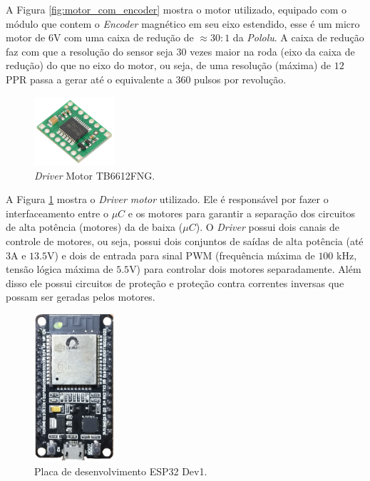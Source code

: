 A Figura \ref{fig:motor_com_encoder} mostra o motor utilizado, equipado com o módulo que contem o \textit{Encoder} magnético em seu eixo estendido, esse é um micro motor de $6$V com uma caixa de redução de $\approx 30:1$ da \textit{Pololu}\cite{Pololu}. A caixa de redução faz com que a resolução do sensor seja $30$ vezes maior na roda (eixo da caixa de redução) do que no eixo do motor, ou seja, de uma resolução (máxima) de $12$PPR passa a gerar até o equivalente a $360$ pulsos por revolução.\\

\begin{figure}[H]
    \centering
    \includegraphics[width=3cm]{figuras/eletronica/driver.jpg}
    \caption{\textit{Driver} Motor TB6612FNG.}
    \label{fig:driver_motor}
\end{figure}

A Figura \ref{fig:driver_motor} mostra o \emph{Driver motor} utilizado. Ele é responsável por fazer o interfaceamento entre o $\mu{}C$ e os motores para garantir a separação dos circuitos de alta potência (motores) da de baixa ($\mu{}C$). O \emph{Driver} possui dois canais de controle de motores, ou seja, possui dois conjuntos de saídas de alta potência (até $3$A e $13.5$V) e dois de entrada para sinal PWM (frequência máxima de $100$ kHz, tensão lógica máxima de $5.5$V) para controlar dois motores separadamente. Além disso ele possui circuitos de proteção e proteção contra correntes inversas que possam ser geradas pelos motores.\\


\begin{figure}[H]
    \centering
    \includegraphics[width=3cm]{figuras/eletronica/esp32_kit.png}
    \caption{Placa de desenvolvimento ESP32 Dev1.}
    \label{fig:esp32_kit}
\end{figure}


